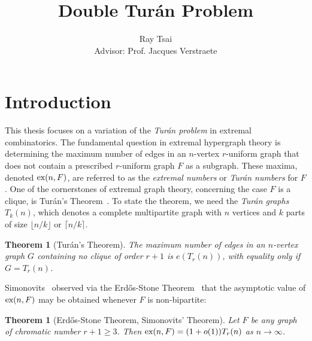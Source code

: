 \documentclass[12pt]{article}
\title{Double Turán Problem}
\author{Ray Tsai \\ Advisor: Prof. Jacques Verstraete}
\newcounter{foo}
\newtheorem{oldtheorem}[foo]{Theorem}
\newcommand*{\ex}{\textnormal{ex}}
\begin{document}
\maketitle



\vspace*{-1cm}

\tableofcontents

\newpage

\section{Introduction}

This thesis focuses on a variation of the \textit{Turán problem} in extremal combinatorics.  The fundamental question in extremal hypergraph theory is determining the maximum number of edges in an $n$-vertex $r$-uniform graph that does not contain a prescribed $r$-uniform graph $F$ as a subgraph. These maxima, denoted $\ex(n, F)$, are referred to as the \textit{extremal numbers} or \textit{Turán numbers} for $F$. One of the cornerstones of extremal graph theory, concerning the case $F$ is a clique, is Tur\'{a}n's Theorem~\cite{Turan1941}. To state the theorem, we need the \textit{Tur\'{a}n graphs} $T_k(n)$, which denotes a complete multipartite graph with $n$ vertices and $k$ parts of size $\lfloor n/k\rfloor$ or $\lceil n/k\rceil$. 

\begin{oldtheorem}[Tur\'{a}n's Theorem]\label{thm:turan}
The maximum number of edges in an $n$-vertex graph $G$ containing no clique of order $r + 1$ is $e(T_r(n))$, with equality only if $G = T_r(n)$.
\end{oldtheorem}

Simonovits~\cite{ErdosSimonovits1966} observed via the Erd\H{o}s-Stone Theorem~\cite{ErdosStone1946} that the asymptotic value of $\ex(n, F)$ may be obtained whenever $F$ is non-bipartite:

\begin{oldtheorem}[Erd\H{o}s-Stone Theorem, Simonovits' Theorem]\label{thm:ess}
Let $F$ be any graph of chromatic number $r + 1 \geq 3$. Then $\ex(n, F) = (1 + o(1))T_r(n)$ as $n \rightarrow \infty$.
\end{oldtheorem}
\end{document}

